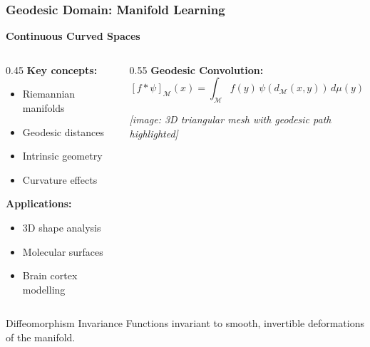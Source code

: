 \begin{frame}[fragile]\frametitle{Geodesic Domain: Manifold Learning}

\begin{center}
\textbf{Continuous Curved Spaces}
\end{center}

\begin{columns}
\begin{column}{0.45\textwidth}
\textbf{Key concepts:}
\begin{itemize}
\item Riemannian manifolds
\item Geodesic distances
\item Intrinsic geometry
\item Curvature effects
\end{itemize}

\textbf{Applications:}
\begin{itemize}
\item 3D shape analysis
\item Molecular surfaces
\item Brain cortex modelling
\end{itemize}
\end{column}
\begin{column}{0.55\textwidth}
\textbf{Geodesic Convolution:}
$$[f * \psi]_{\mathcal{M}}(x) = \int_{\mathcal{M}} f(y)\, \psi(d_{\mathcal{M}}(x,y))\, d\mu(y)$$

\begin{center}
\textit{[image: 3D triangular mesh with geodesic path highlighted]}
\end{center}
\end{column}
\end{columns}

\begin{block}{Diffeomorphism Invariance}
Functions invariant to smooth, invertible deformations of the manifold.
\end{block}

\end{frame}


